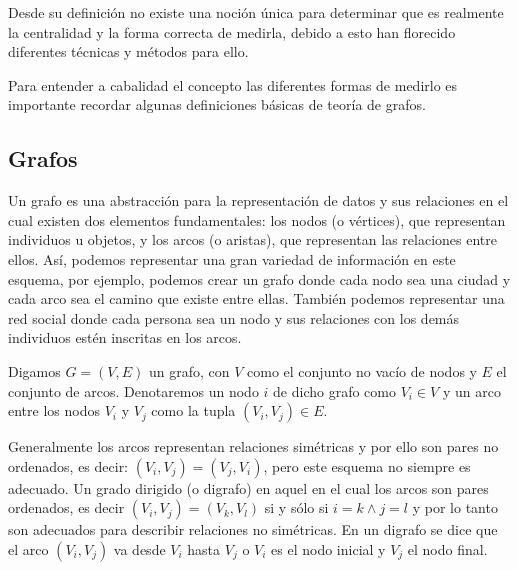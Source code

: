 Desde su definición no existe una noción única para determinar que es realmente 
la centralidad y la forma correcta de medirla\cite{freeman1979centrality},
debido a esto han florecido diferentes técnicas y métodos para ello.

Para entender a cabalidad el concepto las diferentes formas de medirlo es
importante recordar algunas definiciones básicas de teoría de grafos.

\subsection{Grafos}
Un grafo es una abstracción para la representación de datos y sus relaciones en
el cual existen dos elementos fundamentales: los nodos (o vértices), que
representan individuos u objetos, y los arcos (o aristas), que representan las
relaciones entre ellos.
Así, podemos representar una gran variedad de información en este esquema, por
ejemplo, podemos crear un grafo donde cada nodo sea una ciudad y cada arco
sea el camino que existe entre ellas. También podemos representar una red
social donde cada persona sea un nodo y sus relaciones con los demás individuos
estén inscritas en los arcos.

Digamos $G=(V, E)$ un grafo, con $V$ como el conjunto no vacío de nodos y $E$ el
conjunto de arcos.
Denotaremos un nodo $i$ de dicho grafo como  $V_i \in V$ y un arco entre los
nodos $V_i$ y $V_j$ como la tupla $(V_i, V_j) \in E$.

Generalmente los arcos representan relaciones simétricas y por ello son pares no
ordenados, es decir: $(V_i, V_j) = (V_j, V_i)$, pero este esquema no siempre es
adecuado. Un grado dirigido (o digrafo) en aquel en el cual los arcos son pares
ordenados, es decir $(V_i, V_j) = (V_k, V_l)$ si y sólo si $i=k \land j=l$ y por
lo tanto son adecuados para describir relaciones no simétricas. En un digrafo se
dice que el arco $(V_i, V_j)$ va desde $V_i$ hasta $V_j$ o $V_i$ es el nodo
inicial y $V_j$ el nodo final.

